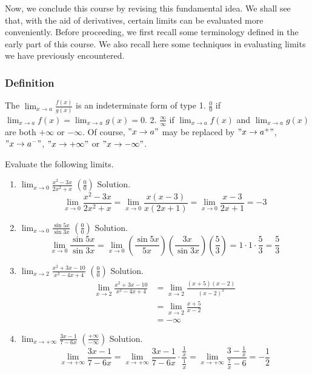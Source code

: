 \documentclass[
  letterpaper,
  DIV=11,
  numbers=noendperiod]{scrartcl}
\begin{document}
Now, we conclude this course by revising this fundamental idea. We shall
see that, with the aid of derivatives, certain limits can be evaluated
more conveniently. Before proceeding, we first recall some terminology
defined in the early part of this course. We also recall here some
techniques in evaluating limits we have previously encountered.

\hypertarget{def:Definition}{}
\hypertarget{definition}{%
\subsubsection{Definition}\label{definition}}

The \(\displaystyle\lim_{x \to a} \frac{f(x)}{g(x)}\) is an
indeterminate form of type 1. \(\frac{0}{0}\) if
\(\displaystyle\lim_{x \to a} f(x) = \displaystyle\lim_{x \to a} g(x)=0\).
2. \(\frac{\infty}{\infty}\) if \(\displaystyle\lim_{x \to a} f(x)\) and
\(\displaystyle\lim_{x \to a} g(x)\) are both \(+\infty\) or
\(-\infty\). Of course, \("x \to a"\) may be replaced by
\("x \to a^+"\), \("x \to a^-"\), \("x \to +\infty"\) or
\("x \to -\infty"\).

\leavevmode{}%
Evaluate the following limits.

\begin{enumerate}
\def\labelenumi{\arabic{enumi}.}
\item
  \(\displaystyle\lim_{x \to 0} \frac{x^2-3x}{2x^2+x}\)
  \(\left(\frac{0}{0}\right)\) Solution. \[
  \displaystyle\lim_{x \to 0} \frac{x^2-3x}{2x^2+x}= \displaystyle\lim_{x \to 0} \frac{x(x-3)}{x(2x+1)}=\displaystyle\lim_{x \to 0} \frac{x-3}{2x+1}=-3
  \]
\item
  \(\displaystyle\lim_{x \to 0} \frac{\sin5x}{\sin3x}\)
  \(\left(\frac{0}{0}\right)\) Solution. \[
  \displaystyle\lim_{x \to 0} \frac{\sin5x}{\sin3x}=\displaystyle\lim_{x \to 0} \left(\frac{\sin5x}{5x}\right)\left(\frac{3x}{\sin3x}\right)\left(\frac{5}{3}\right)=1\cdot1\cdot\frac{5}{3}=\frac{5}{3}
  \]
\item
  \(\displaystyle\lim_{x \to 2} \frac{x^2+3x-10}{x^2-4x+4}\)
  \(\left(\frac{0}{0}\right)\) Solution. \[
  \begin{aligned}
  \displaystyle\lim_{x \to 2} \frac{x^2+3x-10}{x^2-4x+4}&=\displaystyle\lim_{x \to 2}\frac{(x+5)(x-2)}{(x-2)^2}\\&=\displaystyle\lim_{x \to 2}\frac{x+5}{x-2}\\&=-\infty
  \end{aligned}
  \]
\item
  \(\displaystyle\lim_{x \to +\infty}\frac{3x-1}{7-6x}\)
  \(\left(\frac{+\infty}{-\infty}\right)\) Solution. \[
  \displaystyle\lim_{x \to +\infty}\frac{3x-1}{7-6x}=\displaystyle\lim_{x \to +\infty}\frac{3x-1}{7-6x}\cdot \frac{\frac{1}{x}}{\frac{1}{x}}=\displaystyle\lim_{x \to +\infty}\frac{3-\frac{1}{x}}{\frac{7}{x}-6}=-\frac{1}{2}
  \]
\end{enumerate}
\end{document}
